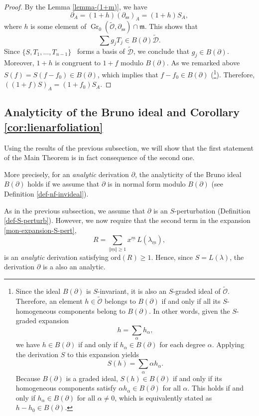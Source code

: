 \documentclass[10pt,twoside,reqno]{amsart}
\theoremstyle{remark}
\theoremstyle{remark}
\newcommand{\um}{{\underline m}}
\newcommand{\tmop}[1]{{\operatorname{#1}}}
\newcommand{\ord}{\mathrm{ord}}
\newcommand{\tO}{\widetilde{\mathcal{O}}}
\newcommand{\cD}{\mathcal{D}}
\newcommand{\tcD}{\widetilde{\cD}}
\begin{document}
\begin{proof}
  By the Lemma \ref{lemma-(1+m)}, we have
  \[ \partial_A = (1 + h) (\partial_{\tmop{ss}})_A = (1 + h) S_A, \]
  where $h$ is some element of $\tmop{Gr}_0 \left( \tO, \partial_{\tmop{ss}}
  \right) \cap \mathfrak{m}$.  This shows that
  \[ \sum g_j T_j \in B (\partial) \tcD. \]
  Since $\{ S, T_1, \ldots, T_{n-1} \}$ \ forms a basis of $\tcD$, we conclude that $g_j \in B
  (\partial)$. Moreover, $1 + h$ is congruent to $1 + f$ modulo $B
  (\partial)$. As we remarked above $S (f) = S (f - f_0) \in B (\partial)$,
  which implies that $f - f_0 \in B (\partial)$ (\footnote{Since the ideal $B(\partial)$ is $S$-invariant, it is also an $S$-graded ideal of $\tO$. Therefore, an element $h \in \tO$ belongs to $B(\partial)$ if and only if all its $S$-homogeneous components belong to $B(\partial)$. In other words, given the $S$-graded expansion
\[
h = \sum_{\alpha} h_{\alpha},
\]
we have $h \in B(\partial)$ if and only if $h_{\alpha} \in B(\partial)$ for each degree $\alpha$. Applying the derivation $S$ to this expansion yields
\[
S(h) = \sum_{\alpha} \alpha h_{\alpha}.
\]
Because $B(\partial)$ is a graded ideal, $S(h) \in B(\partial)$ if and only if its homogeneous components satisfy $\alpha h_{\alpha} \in B(\partial)$ for all $\alpha$. This holds if and only if $h_{\alpha} \in B(\partial)$ for all $\alpha \neq 0$, which is equivalently stated as $h - h_0 \in B(\partial)$.}). Therefore, $((1 + f) S)_A = (1 +
  f_0) S_A$.
\end{proof}
\subsection{Analyticity of the Bruno ideal and Corollary \ref{cor:lienarfoliation}}
Using the results of the previous subsection, we will show that the first statement of the Main Theorem is in fact consequence of the second one. 

More precisely, for an {\em analytic} derivation $\partial$, the analyticity of the Bruno ideal $B(\partial)$ holds if we assume that  $\partial$ is in normal form modulo $B(\partial)$ (see Definition \ref{def-nf-invideal}). 

As in the previous subsection, we assume that $\partial$ is an $S$-perturbation (Definition \ref{def-S-perturb}). However, we now require that the second term in the expansion \eqref{mon-expansion-S-pert},
$$R = \sum_{\Vert{}\um\Vert{} \ge 1} x^{\um} \, L(\lambda_{\um}),$$
is an \emph{analytic} derivation satisfying $\ord(R) \ge 1$. Hence, since $S=L(\lambda)$, the derivation $\partial$ is a also an analytic.
\end{document}
